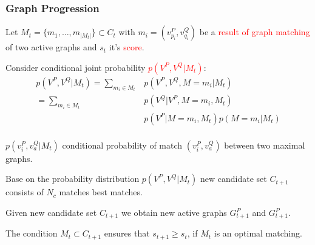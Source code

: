 \documentclass[hyperref={pdfpagelabels=false}]{beamer}
\begin{document}
\begin{frame} [allowframebreaks]
\frametitle{Graph Progression}
Let $M_t=\{m_1,\dots,m_{|M_t|}\}\subset C_t$ with $m_i=(v_{p_i}^P,v_{q_i}^Q)$ be a \textcolor{red}{result of graph matching} of two active graphs and $s_t$ it's \textcolor{red}{score}.

Consider conditional joint probability \textcolor{red}{$p(V^P,V^Q|M_t)$}:
\begin{align*}
	p(V^P,V^Q|M_t) = \sum_{m_i\in M_t}& p(V^P,V^Q,M=m_i|M_t) \\
				   = \sum_{m_i\in M_t}& p(V^Q|V^P,M=m_i,M_t)\\
				   & p(V^P|M=m_i, M_t) p(M=m_i|M_t)\\
\end{align*}

\framebreak

$p(v_i^P,v_a^Q|M_t)$	conditional probability of match $(v_i^P,v_a^Q)$ between two maximal graphs.

Base on the probability distribution $p(V^P,V^Q|M_t)$ new candidate set $C_{t+1}$ consists of $N_c$ matches best matches. 

Given new candidate set $C_{t+1}$ we obtain new active graphs $G_{t+1}^P$ and $G_{t+1}^P$.

The condition $M_t\subset C_{t+1}$ ensures that $s_{t+1}\ge s_t$, if $M_t$ is an optimal matching. 

\end{frame}
\end{document}
